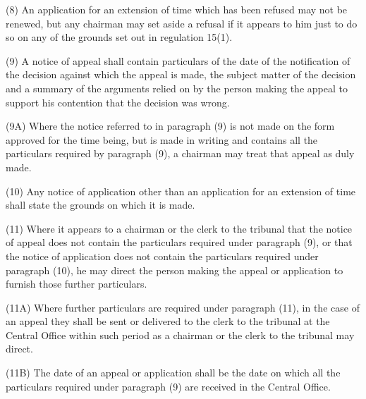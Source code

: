 \documentclass[12pt,a4paper]{article}
\begin{document}
(8) An application for an extension of time which has been refused may not be renewed, but any chairman may set aside a refusal if it appears to him just to do so on any of the grounds set out in regulation 15(1).


(9) A notice of appeal shall contain particulars of the date of the notification of the decision against which the appeal is made, the subject matter of the decision and a summary of the arguments relied on by the person making the appeal to support his contention that the decision was wrong.

(9A) Where the notice referred to in paragraph (9) is not made on the form approved for the time being, but is made in writing and contains all the particulars required by paragraph (9), a chairman may treat that appeal as duly made.

(10) Any notice of 
application other than an application for an extension of time shall state the grounds on which it is made.


(11) Where it appears to a chairman or the clerk to the tribunal that the notice of appeal does not contain the particulars required under paragraph (9), or that the notice of application does not contain the particulars required under paragraph (10), he may direct the person making the appeal or application to furnish those further particulars.

(11A) Where further particulars are required under paragraph (11), in the case of an appeal they shall be sent or delivered to the clerk to the tribunal at the Central Office within such period as a chairman or the clerk to the tribunal may direct.

(11B) The date of an appeal or application shall be the date on which all the particulars required under paragraph (9) are received in the Central Office.
\end{document}
